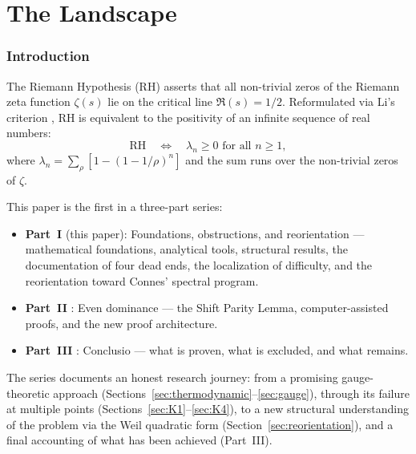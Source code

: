 \documentclass[12pt,a4paper]{article}
\theoremstyle{definition}
\theoremstyle{remark}
\begin{document}
\part*{The Landscape}


\section{Introduction}
\label{sec:intro}

The Riemann Hypothesis (RH) asserts that all non-trivial zeros of the Riemann zeta function $\zeta(s)$ lie on the critical line $\Re(s) = 1/2$. Reformulated via Li's criterion \cite{Li1997}, RH is equivalent to the positivity of an infinite sequence of real numbers:
\begin{equation}
\label{eq:li-criterion}
\text{RH} \quad \Longleftrightarrow \quad \lambda_n \geq 0 \text{ for all } n \geq 1,
\end{equation}
where $\lambda_n = \sum_\rho [1 - (1-1/\rho)^n]$ and the sum runs over the non-trivial zeros of $\zeta$.

This paper is the first in a three-part series:
\begin{itemize}
  \item \textbf{Part~I} (this paper): Foundations, obstructions, and reorientation --- mathematical foundations, analytical tools, structural results, the documentation of four dead ends, the localization of difficulty, and the reorientation toward Connes' spectral program.
  \item \textbf{Part~II} \cite{Geiger2026partII}: Even dominance --- the Shift Parity Lemma, computer-assisted proofs, and the new proof architecture.
  \item \textbf{Part~III} \cite{Geiger2026partIII}: Conclusio --- what is proven, what is excluded, and what remains.
\end{itemize}

The series documents an honest research journey: from a promising gauge-theoretic approach (Sections~\ref{sec:thermodynamic}--\ref{sec:gauge}), through its failure at multiple points (Sections~\ref{sec:K1}--\ref{sec:K4}), to a new structural understanding of the problem via the Weil quadratic form (Section~\ref{sec:reorientation}), and a final accounting of what has been achieved (Part~III).
\end{document}
